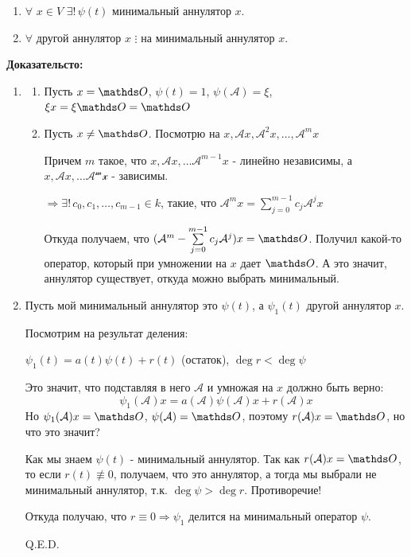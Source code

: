 \begin{enumerate}
    \item $\forall $ $x \in V $ $ \exists! \, \psi(t)$ минимальный аннулятор $x$.
    \item $\forall$ другой аннулятор $x$  $\vdots$ на минимальный аннулятор $x$.
\end{enumerate}

\textbf{Доказательсто:}
\begin{enumerate}
    \item 
    \begin{enumerate}
        \item Пусть $x = \zero$, $\psi(t)=1$, $\psi(\mathcal{A})=\xi$,  $\xi x=\xi \zero = \zero$

        \item Пусть $x \ne \zero$. Посмотрю на $x, \mathcal{A}x,\mathcal{A}^2x,\ldots,\mathcal{A}^mx$

        Причем $m$ такое, что $x, \mathcal{A}x, \ldots \mathcal{A}^{m-1}x$ - линейно независимы, а   $x, \mathcal{A}x, \ldots \mathcal{A^{m}x}$ - зависимы.

    $\Rightarrow  \exists! \, c_0,c_1,\ldots,c_{m-1} \in k$, такие, что $\mathcal{A}^mx = \sum\limits_{j=0}^{m-1}c_j\mathcal{A}^jx$

    Откуда получаем, что  $(\mathcal{A}^m- \sum\limits_{j=0}^{m-1}c_j\mathcal{A}^j)x= \zero$. Получил какой-то оператор, который при умножении на $x$ дает $\zero$. А это значит, аннулятор существует, откуда можно выбрать минимальный.
    \end{enumerate}
    \item Пусть мой минимальный аннулятор это $\psi(t)$, а $\psi_1(t)$ другой аннулятор $x$.

    Посмотрим на результат деления:

    $\psi_1(t)=a(t) \psi(t) + r(t)$ (остаток), $\deg r < \deg \psi$

    Это значит, что подставляя в него $\mathcal{A}$ и умножая на $x$ должно быть верно:
    $$\psi_1(\mathcal{A})x = a(\mathcal{A})\psi(\mathcal{A})x+r(\mathcal{A})x$$
    Но $\psi_1(\mathcal{A})x = \zero$, $\psi(\mathcal{A}) = \zero$, поэтому $  r(\mathcal{A})x= \zero$, но что это значит?

    Как мы знаем $\psi(t)$ - минимальный аннулятор. Так как $r(\mathcal{A})x = \zero$, то если $r(t)\not \equiv 0$, получаем, что это аннулятор, а тогда мы выбрали не минимальный аннулятор, т.к. $\deg \psi> \deg r$. Противоречие!

    Откуда получаю, что $r\equiv0 \Rightarrow  \psi_1$ делится на минимальный оператор $\psi$.

    \hfill Q.E.D.

\end{enumerate}


